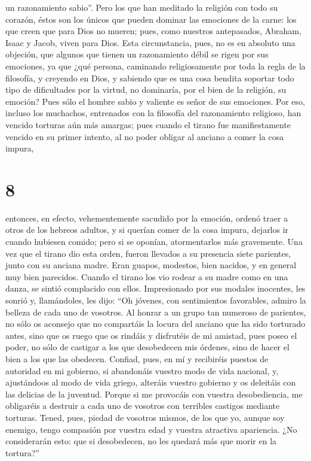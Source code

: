 un razonamiento sabio''.  Pero los que han meditado la
religión con todo su corazón, éstos son los únicos que pueden dominar
las emociones de la carne:  los que creen que para Dios
no mueren; pues, como nuestros antepasados, Abraham, Isaac y Jacob,
viven para Dios.  Esta circunstancia, pues, no es en
absoluto una objeción, que algunos que tienen un razonamiento débil se
rigen por sus emociones,  ya que ¿qué persona, caminando
religiosamente por toda la regla de la filosofía, y creyendo en Dios,
 y sabiendo que es una cosa bendita soportar todo tipo de
dificultades por la virtud, no dominaría, por el bien de la religión, su
emoción?  Pues sólo el hombre sabio y valiente es señor
de sus emociones.  Por eso, incluso los muchachos,
entrenados con la filosofía del razonamiento religioso, han vencido
torturas aún más amargas;  pues cuando el tirano fue
manifiestamente vencido en su primer intento, al no poder obligar al
anciano a comer la cosa impura,

\hypertarget{section-7}{%
\section{8}\label{section-7}}

 entonces, en efecto, vehementemente sacudido por la
emoción, ordenó traer a otros de los hebreos adultos, y si querían comer
de la cosa impura, dejarlos ir cuando hubiesen comido; pero si se
oponían, atormentarlos más gravemente.  Una vez que el
tirano dio esta orden, fueron llevados a su presencia siete parientes,
junto con su anciana madre. Eran guapos, modestos, bien nacidos, y en
general muy bien parecidos.  Cuando el tirano los vio
rodear a su madre como en una danza, se sintió complacido con ellos.
Impresionado por sus modales inocentes, les sonrió y, llamándoles, les
dijo:  ``Oh jóvenes, con sentimientos favorables, admiro
la belleza de cada uno de vosotros. Al honrar a un grupo tan numeroso de
parientes, no sólo os aconsejo que no compartáis la locura del anciano
que ha sido torturado antes,  sino que os ruego que os
rindáis y disfrutéis de mi amistad, pues poseo el poder, no sólo de
castigar a los que desobedecen mis órdenes, sino de hacer el bien a los
que las obedecen.  Confiad, pues, en mí y recibiréis
puestos de autoridad en mi gobierno, si abandonáis vuestro modo de vida
nacional,  y, ajustándoos al modo de vida griego, alteráis
vuestro gobierno y os deleitáis con las delicias de la juventud.
 Porque si me provocáis con vuestra desobediencia, me
obligaréis a destruir a cada uno de vosotros con terribles castigos
mediante torturas.  Tened, pues, piedad de vosotros
mismos, de los que yo, aunque soy enemigo, tengo compasión por vuestra
edad y vuestra atractiva apariencia.  ¿No considerarán
esto: que si desobedecen, no les quedará más que morir en la tortura?''

